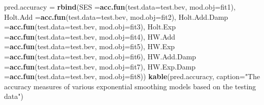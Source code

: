 \documentclass[
]{book}
\newenvironment{Shaded}{\begin{snugshade}}{\end{snugshade}}
\newcommand{\AttributeTok}[1]{\textcolor[rgb]{0.13,0.29,0.53}{#1}}
\newcommand{\ControlFlowTok}[1]{\textcolor[rgb]{0.13,0.29,0.53}{\textbf{#1}}}
\newcommand{\DecValTok}[1]{\textcolor[rgb]{0.00,0.00,0.81}{#1}}
\newcommand{\DocumentationTok}[1]{\textcolor[rgb]{0.56,0.35,0.01}{\textbf{\textit{#1}}}}
\newcommand{\FunctionTok}[1]{\textcolor[rgb]{0.13,0.29,0.53}{\textbf{#1}}}
\newcommand{\NormalTok}[1]{#1}
\newcommand{\OtherTok}[1]{\textcolor[rgb]{0.56,0.35,0.01}{#1}}
\newcommand{\SpecialCharTok}[1]{\textcolor[rgb]{0.81,0.36,0.00}{\textbf{#1}}}
\newcommand{\StringTok}[1]{\textcolor[rgb]{0.31,0.60,0.02}{#1}}
\begin{document}
\begin{Shaded}
\end{Shaded}

\begin{Shaded}
\begin{Highlighting}[]
\NormalTok{pred.accuracy }\OtherTok{=} \FunctionTok{rbind}\NormalTok{(}\AttributeTok{SES =}\FunctionTok{acc.fun}\NormalTok{(}\AttributeTok{test.data=}\NormalTok{test.bev, }\AttributeTok{mod.obj=}\NormalTok{fit1),}
                      \AttributeTok{Holt.Add =}\FunctionTok{acc.fun}\NormalTok{(}\AttributeTok{test.data=}\NormalTok{test.bev, }\AttributeTok{mod.obj=}\NormalTok{fit2),}
                      \AttributeTok{Holt.Add.Damp =}\FunctionTok{acc.fun}\NormalTok{(}\AttributeTok{test.data=}\NormalTok{test.bev, }\AttributeTok{mod.obj=}\NormalTok{fit3),}
                      \AttributeTok{Holt.Exp =}\FunctionTok{acc.fun}\NormalTok{(}\AttributeTok{test.data=}\NormalTok{test.bev, }\AttributeTok{mod.obj=}\NormalTok{fit4),}
                      \AttributeTok{HW.Add =}\FunctionTok{acc.fun}\NormalTok{(}\AttributeTok{test.data=}\NormalTok{test.bev, }\AttributeTok{mod.obj=}\NormalTok{fit5),}
                      \AttributeTok{HW.Exp =}\FunctionTok{acc.fun}\NormalTok{(}\AttributeTok{test.data=}\NormalTok{test.bev, }\AttributeTok{mod.obj=}\NormalTok{fit6),}
                      \AttributeTok{HW.Add.Damp =}\FunctionTok{acc.fun}\NormalTok{(}\AttributeTok{test.data=}\NormalTok{test.bev, }\AttributeTok{mod.obj=}\NormalTok{fit7),}
                      \AttributeTok{HW.Exp.Damp =}\FunctionTok{acc.fun}\NormalTok{(}\AttributeTok{test.data=}\NormalTok{test.bev, }\AttributeTok{mod.obj=}\NormalTok{fit8))}
\FunctionTok{kable}\NormalTok{(pred.accuracy, }\AttributeTok{caption=}\StringTok{"The accuracy measures of various exponential smoothing models }
\StringTok{      based on the testing data"}\NormalTok{)}
\end{Highlighting}
\end{Shaded}
\end{document}
